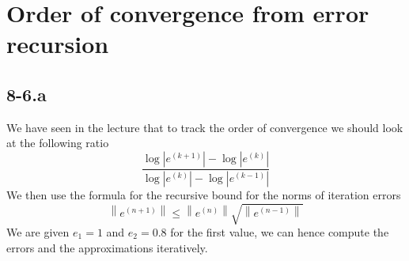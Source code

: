 \documentclass{article}
\begin{document}
\section*{Order of convergence from error recursion}
\subsection*{8-6.a} 
We have seen in the lecture that to track the order of convergence we should look at the following ratio
\begin{equation*}
    \frac{\log\left\lvert e^{\left(k +1\right)}\right\rvert - \log\left\lvert e^{\left(k\right)}\right\rvert}{\log\left\lvert e^{\left(k\right)}\right\rvert - \log \left\lvert e^{\left(k - 1\right)}\right\rvert}
\end{equation*}
We then use the formula for the recursive bound for the norms of iteration errors
\begin{equation*}
    \left\lVert e^{\left(n + 1\right)}\right\rVert \leq \left\lVert e^{\left(n\right)}\right\rVert
    \sqrt{\left\lVert e^{\left(n - 1\right)}\right\rVert}
\end{equation*}
We are given $e_1 = 1$ and $e_2 = 0.8$ for the first value, we can hence compute the errors and the approximations iteratively.
\end{document}
